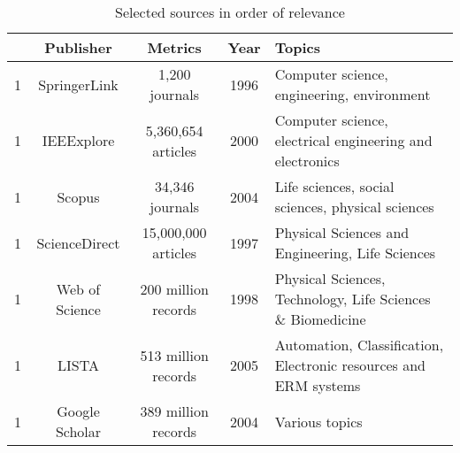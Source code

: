\begin{table}[h]
  \centering
  \caption{Selected sources in order of relevance}
  \begin{tabularx}{\textwidth}{ccccY}
    \toprule
    \textbf{} & \textbf{Publisher} & \textbf{Metrics}    & \textbf{Year} & \textbf{Topics}                                                  \\
             & SpringerLink       & 1,200 journals      & 1996          & Computer science, engineering, environment                       \\
    1         & IEEExplore         & 5,360,654 articles  & 2000          & Computer science, electrical engineering and electronics         \\
    1         & Scopus             & 34,346 journals     & 2004          & Life sciences, social sciences, physical sciences                \\
    1         & ScienceDirect      & 15,000,000 articles & 1997          & Physical Sciences and Engineering, Life Sciences                 \\
    1         & Web of Science     & 200 million records & 1998          & Physical Sciences, Technology, Life Sciences \& Biomedicine      \\
    1         & LISTA              & 513 million records & 2005          & Automation, Classification, Electronic resources and ERM systems \\
    1         & Google Scholar     & 389 million records & 2004          & Various topics                                                   \\
    \bottomrule
  \end{tabularx}
  \label{tab2:}
\end{table}


\usepackage{xifthen}

\newcommand{\tablestyle}[1]{
  \ifthenelse{\equal{#1}{box}}{
    \newcommand{\styleBeginTabular}{\begin{tabularx}{\textwidth}{|c|c|c|c|Y|}}
    \newcommand{\styleTopRule}{\hline}
    \newcommand{\styleMidRule}{\hline}
    \newcommand{\styleBottomRule}{\hline}
    \newcommand{\styleRowEnd}{\\\hline}
  }{
    \newcommand{\styleBeginTabular}{\begin{tabularx}{\textwidth}{ccccY}}
    \newcommand{\styleTopRule}{\toprule}
    \newcommand{\styleMidRule}{\midrule}
    \newcommand{\styleBottomRule}{\bottomrule}
    \newcommand{\styleRowEnd}{\\}
  }
}

